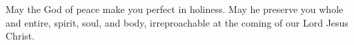 \lettrine[loversize=0.15,lines=2]{M}{}ay the God of peace make you perfect in holiness. May he preserve you whole and entire, spirit, soul, and body, irreproachable at the coming of our Lord Jesus Christ.